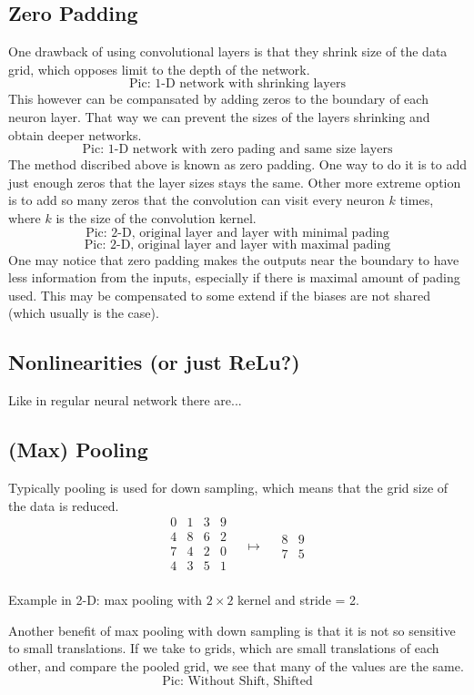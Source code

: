 \documentclass[]{article}
\begin{document}
\subsection{Zero Padding}
One drawback of using convolutional layers is that they shrink size of the data
grid, which opposes limit to the depth of the network.
\[
\text{Pic: 1-D network with shrinking layers}
\]
This however can be compansated by
adding zeros to the boundary of each neuron layer. That way we can prevent the
sizes of the layers shrinking and obtain deeper networks.
\[
\text{Pic: 1-D network with zero pading and same size layers}
\]
The method discribed above is known as zero padding. One way to do it is to add
just enough zeros that the layer sizes stays the same. Other more extreme option
is to add so many zeros that the convolution can visit every neuron $k$ times,
where $k$ is the size of the convolution kernel.
\[
\text{Pic: 2-D, original layer and layer with minimal pading}
\]
\[
\text{Pic: 2-D, original layer and layer with maximal pading}
\]
One may notice that zero padding makes the outputs near the boundary to have less
information from the inputs, especially if there is maximal amount of pading
used. This may be compensated to some extend if the biases are not shared (which
usually is the case).

\subsection{Nonlinearities (or just ReLu?)}
Like in regular neural network there are...


\subsection{(Max) Pooling}
Typically pooling is used for down sampling, which means that the grid size of
the data is reduced.
\[
\begin{array}{c|c|c|c}
  0 & 1 & 3 & 9\\
  \hline
  4 & 8 & 6 & 2\\
  \hline
  7 & 4 & 2 & 0\\
  \hline
  4 & 3 & 5 & 1\\
 \end{array}
 \quad \mapsto \quad
 \begin{array}{c|c}
   8 & 9\\
   \hline
   7 & 5
  \end{array}
 \]
\begin{center}Example in 2-D: max pooling with $2\times2$ kernel and stride = 2.\end{center}
Another benefit of max pooling with down sampling is that it is not so sensitive
to small translations. If we take to grids, which are small translations of each
other, and compare the pooled grid, we see that many of the values are the same.
\[
\text{Pic: Without Shift, Shifted}
\]
\end{document}

